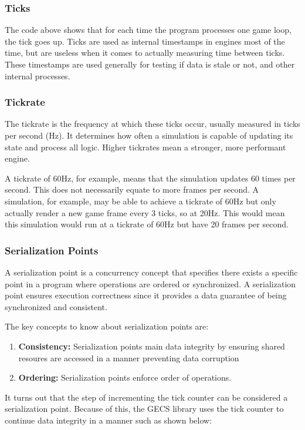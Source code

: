\subsubsection{Ticks}

The code above shows that for each time the program processes one game loop, the tick goes up. Ticks are used as internal timestamps in engines most of the time, but are useless when it comes to actually measuring time between ticks. These timestamps are used generally for testing if data is stale or not, and other internal processes. 

\subsubsection{Tickrate}

The tickrate is the frequency at which these ticks occur, usually measured in ticks per second (Hz). It determines how often a simulation is capable of updating its state and process all logic. Higher tickrates mean a stronger, more performant engine. 

A tickrate of 60Hz, for example, means that the simulation updates 60 times per second. This does not necessarily equate to more frames per second. A simulation, for example, may be able to achieve a tickrate of 60Hz but only actually render a new game frame every 3 ticks, so at 20Hz. This would mean this simulation would run at a tickrate of 60Hz but have 20 frames per second. 

\subsubsection{Serialization Points}
A serialization point is a concurrency concept that specifies there exists a specific point in a program where operations are ordered or synchronized. A serialization point ensures execution correctness since it provides a data guarantee of being synchronized and consistent.

The key concepts to know about serialization points are:
\begin{enumerate}
    \item \textbf{Consistency:} Serialization points main data integrity by ensuring shared resoures are accessed in a manner preventing data corruption
    \item \textbf{Ordering:} Serialization points enforce order of operations.
\end{enumerate}

It turns out that the step of incrementing the tick counter can be considered a serialization point. Because of this, the GECS library uses the tick counter to continue data integrity in a manner such as shown below:


